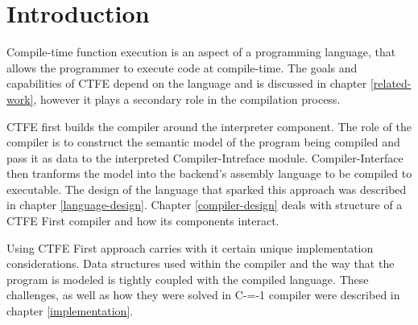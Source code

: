 \section{Introduction}

Compile-time function execution is an aspect of a programming language, that allows the programmer to execute code at compile-time.
The goals and capabilities of CTFE depend on the language and is discussed in chapter \ref{related-work}, however it plays a secondary role in the compilation process.

CTFE first builds the compiler around the interpreter component.
The role of the compiler is to construct the semantic model of the program being compiled and pass it as data to the interpreted Compiler-Intreface module.
Compiler-Interface then tranforms the model into the backend's assembly language to be compiled to executable.
The design of the language that sparked this approach was described in chapter \ref{language-design}.
Chapter \ref{compiler-design} deals with structure of a CTFE First compiler and how its components interact.

Using CTFE First approach carries with it certain unique implementation considerations.
Data structures used within the compiler and the way that the program is modeled is tightly coupled with the compiled language.
These challenges, as well as how they were solved in C-=-1 compiler were described in chapter \ref{implementation}.
